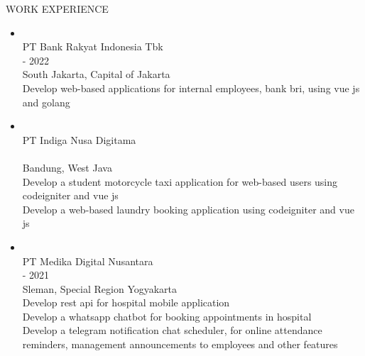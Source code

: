

\begin{tcolorbox}
    [
    width=\textwidth, 
    colframe=WhiteSmoke,
    colback=LinkedInBlue,
    arc=1mm,
    ]
    \color{WhiteSmoke}
    \centerline{\Large WORK EXPERIENCE}
\end{tcolorbox}


\begin{itemize}

    \item {\color{LinkedInBlue} }\\
    {
        \mybullet PT Bank Rakyat Indonesia Tbk \\
         - 2022 \\
        \mybullet South Jakarta, Capital of Jakarta \\
        \mybullet Develop web-based applications for internal employees, bank bri, using vue js and golang \\
    }

    \item {\color{LinkedInBlue} }\\
    {
        \mybullet PT Indiga Nusa Digitama \\
         \\
        \mybullet Bandung, West Java \\
        \mybullet Develop a student motorcycle taxi application for web-based users using codeigniter and vue js \\
        \mybullet Develop a web-based laundry booking application using codeigniter and vue js \\
    }

    \item {\color{LinkedInBlue} }\\
    {
        \mybullet PT Medika Digital Nusantara \\
         - 2021 \\
        \mybullet Sleman, Special Region Yogyakarta \\
        \mybullet Develop rest api for hospital mobile application \\
        \mybullet Develop a whatsapp chatbot for booking appointments in hospital \\
        \mybullet Develop a telegram notification chat scheduler, for online attendance reminders, management announcements to employees and other features \\
    }


\end{itemize}
